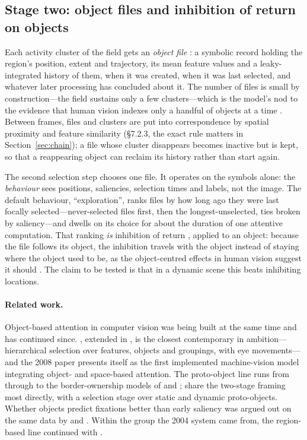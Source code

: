 \documentclass[11pt,a4paper]{article}
\begin{document}
\subsection{Stage two: object files and inhibition of return on objects}
Each activity cluster of the field gets an \emph{object file} \citep{kahneman1992}:
a symbolic record holding the region's position, extent and trajectory, its mean
feature values and a leaky-integrated history of them, when it was created, when
it was last selected, and whatever later processing has concluded about it. The
number of files is small by construction---the field sustains only a few
clusters---which is the model's nod to the evidence that human vision indexes
only a handful of objects at a time \citep{pylyshyn1988}. Between frames, files
and clusters are put into correspondence by spatial proximity and feature
similarity (\S7.2.3, the exact rule matters in Section~\ref{sec:chain}); a file
whose cluster disappears becomes inactive but is kept, so that a reappearing
object can reclaim its history rather than start again.

The second selection step chooses one file. It operates on the symbols alone:
the \emph{behaviour} sees positions, saliencies, selection times and labels, not
the image. The default behaviour, ``exploration'', ranks files by how long ago
they were last focally selected---never-selected files first, then the
longest-unselected, ties broken by saliency---and dwells on its choice for about
the duration of one attentive computation. That ranking \emph{is} inhibition of
return \citep{posner1984,klein2000}, applied to an object: because the file
follows its object, the inhibition travels with the object instead of staying
where the object used to be, as the object-centred effects in human vision
suggest it should \citep{tipper1991}. The claim to be tested is that in a
dynamic scene this beats inhibiting locations.

\paragraph{Related work.} Object-based attention in computer vision was being
built at the same time and has continued since. \citet{sun2003}, extended in
\citet{sun2008}, is the closest contemporary in ambition---hierarchical
selection over features, objects and groupings, with eye movements---and the
2008 paper presents itself as the first implemented machine-vision model
integrating object- and space-based attention. The proto-object line runs from
\citet{walther2006} through \citet{orabona2007} to the border-ownership models
of \citet{russell2014} and \citet{uejima2020}; \citet{wischnewski2010} share the
two-stage framing most directly, with a selection stage over static and dynamic
proto-objects. Whether objects predict fixations better than early saliency was
argued out on the same data by \citet{einhauser2008} and \citet{borji2013objects}.
Within the group the 2004 system came from, the region-based line continued with
\citet{aziz2007}.
\end{document}
